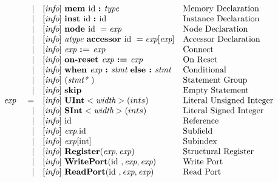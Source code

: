 \documentclass[12pt]{article}
\begin{document}
\[\begin{array}{rrll}
                &\vert &[\text{\em info}]\  \text{\bf mem\ } \text{id } \text{\bf :\ } \text{\em type\ }                                           &\text{Memory Declaration}\\
                &\vert &[\text{\em info}]\  \text{\bf inst\ } \text{id } \text{\bf :\ } \text{id }                                               &\text{Instance Declaration}\\
                &\vert &[\text{\em info}]\  \text{\bf node\ } \text{id }  = \text{\em exp\ }                                               &\text{Node Declaration}\\
                &\vert &[\text{\em info}]\  \text{\em atype\ }  \text{\bf accessor\ } \text{id } = \text{\em exp}[\text{\em exp}]                    &\text{Accessor Declaration}\\
                &\vert &[\text{\em info}]\  \text{\em exp\ } \text{\bf :=\ } \text{\em exp\ }                                               &\text{Connect}\\
                &\vert &[\text{\em info}]\  \text{\bf on-reset\ } \text{\em exp\ } \text{\bf :=\ } \text{\em exp\ }                                 &\text{On Reset}\\
                &\vert &[\text{\em info}]\  \text{\bf when\ } \text{\em exp\ } \text{\bf :\ } \text{\em stmt\ } \text{\bf else :\ } \text{\em stmt\ }               &\text{Conditional}\\
                &\vert &[\text{\em info}]\  (\text{\em stmt*\ })                                                            &\text{Statement Group}\\
                &\vert &[\text{\em info}]\  \text{\bf skip\ }                                                               &\text{Empty Statement}\\
\text{\em exp\ }        &=     &[\text{\em info}]\  \text{\bf UInt}<\text{\em width}>(ints)                                           &\text{Literal Unsigned Integer}\\
                &\vert &[\text{\em info}]\  \text{\bf SInt}<\text{\em width}>(ints)                                           &\text{Literal Signed Integer}\\
                &\vert &[\text{\em info}]\  \text{id }                                                                     &\text{Reference}\\
                &\vert &[\text{\em info}]\  \text{\em exp}.\text{id }                                                           &\text{Subfield}\\
                &\vert &[\text{\em info}]\  \text{\em exp}[\text{int}]                                                        &\text{Subindex}\\
                &\vert &[\text{\em info}]\  \text{\bf Register}(\text{\em exp}, \text{\em exp})                                    &\text{Structural Register}\\
                &\vert &[\text{\em info}]\  \text{\bf WritePort}(\text{id }, \text{\em exp}, \text{\em exp})                              &\text{Write Port}\\
                &\vert &[\text{\em info}]\  \text{\bf ReadPort}(\text{id }, \text{\em exp}, \text{\em exp})                               &\text{Read Port}\\
\end{array}
\]
\end{document}
